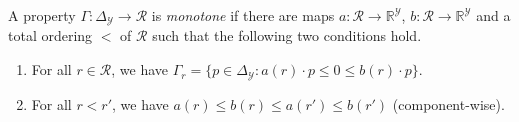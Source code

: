 \documentclass[anon,12pt]{colt2019}
\newcommand{\reals}{\mathbb{R}}
\newcommand{\simplex}{\Delta_\Y}
\newcommand{\R}{\mathcal{R}}
\newcommand{\Y}{\mathcal{Y}}
\begin{document}
\begin{definition}\label{def:monotone-prop}
  A property $\Gamma:\simplex\to\R$ is \emph{monotone} if there are maps $a:\R\to\reals^\Y$, $b:\R\to\reals^\Y$ and a total ordering $<$ of $\R$ such that the following two conditions hold.
  \begin{enumerate}
  \item For all $r\in\R$, we have $\Gamma_r = \{p\in\simplex : a(r) \cdot p \leq 0 \leq b(r) \cdot p\}$.
  \item For all $r < r'$, we have $a(r) \leq b(r) \leq a(r') \leq b(r')$ (component-wise).
  \end{enumerate}
\end{definition}
\end{document}
